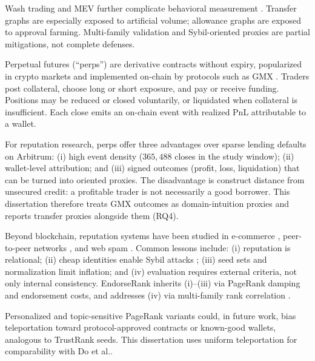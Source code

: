 Wash trading and MEV further complicate behavioral measurement . Transfer graphs are especially exposed to artificial volume; allowance graphs are exposed to approval farming. Multi-family validation and Sybil-oriented proxies are partial mitigations, not complete defenses.


Perpetual futures (``perps'') are derivative contracts without expiry, popularized in crypto markets and implemented on-chain by protocols such as GMX . Traders post collateral, choose long or short exposure, and pay or receive funding. Positions may be reduced or closed voluntarily, or liquidated when collateral is insufficient. Each close emits an on-chain event with realized PnL attributable to a wallet.

For reputation research, perps offer three advantages over sparse lending defaults on Arbitrum: (i) high event density ($365{,}488$ closes in the study window); (ii) wallet-level attribution; and (iii) signed outcomes (profit, loss, liquidation) that can be turned into oriented proxies. The disadvantage is construct distance from unsecured credit: a profitable trader is not necessarily a good borrower. This dissertation therefore treats GMX outcomes as domain-intuition proxies and reports transfer proxies alongside them (RQ4).


Beyond blockchain, reputation systems have been studied in e-commerce , peer-to-peer networks , and web spam . Common lessons include: (i) reputation is relational; (ii) cheap identities enable Sybil attacks ; (iii) seed sets and normalization limit inflation; and (iv) evaluation requires external criteria, not only internal consistency. EndorseRank inherits (i)--(iii) via PageRank damping and endorsement costs, and addresses (iv) via multi-family rank correlation .

Personalized and topic-sensitive PageRank variants  could, in future work, bias teleportation toward protocol-approved contracts or known-good wallets, analogous to TrustRank seeds. This dissertation uses uniform teleportation for comparability with Do et al..


